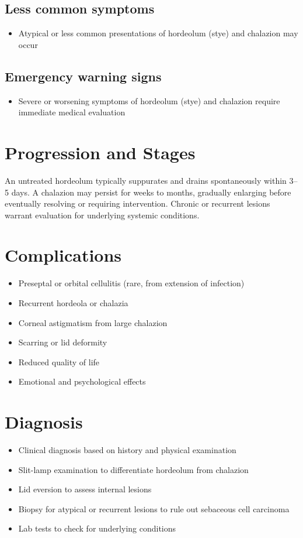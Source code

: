 \subsection{Less common symptoms}
\begin{itemize}[noitemsep]
  \item Atypical or less common presentations of hordeolum (stye) and chalazion may occur
\end{itemize}

\subsection{Emergency warning signs}
\begin{itemize}[noitemsep]
  \item Severe or worsening symptoms of hordeolum (stye) and chalazion require immediate medical evaluation
\end{itemize}
\section{Progression and Stages}
An untreated hordeolum typically suppurates and drains spontaneously within 3--5 days. A chalazion may persist for weeks to months, gradually enlarging before eventually resolving or requiring intervention. Chronic or recurrent lesions warrant evaluation for underlying systemic conditions.

\section{Complications}

\begin{itemize}[noitemsep]
  \item Preseptal or orbital cellulitis (rare, from extension of infection)
  \item Recurrent hordeola or chalazia
  \item Corneal astigmatism from large chalazion
  \item Scarring or lid deformity
  \item Reduced quality of life
  \item Emotional and psychological effects
\end{itemize}

\section{Diagnosis}

\begin{itemize}[noitemsep]
  \item Clinical diagnosis based on history and physical examination
  \item Slit-lamp examination to differentiate hordeolum from chalazion
  \item Lid eversion to assess internal lesions
  \item Biopsy for atypical or recurrent lesions to rule out sebaceous cell carcinoma
  \item Lab tests to check for underlying conditions
\end{itemize}


